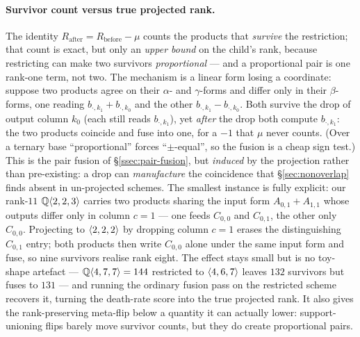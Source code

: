 \paragraph{Survivor count versus true projected rank.} The identity
\(R_{\text{after}}=R_{\text{before}}-\mu\) counts the products that \emph{survive} the
restriction; that count is exact, but only an \emph{upper bound} on the child's rank,
because restricting can make two survivors \emph{proportional} --- and a proportional pair
is one rank-one term, not two. The mechanism is a linear form losing a coordinate: suppose
two products agree on their \(\alpha\)- and \(\gamma\)-forms and differ only in their
\(\beta\)-forms, one reading \(b_{\cdot,k_1}+b_{\cdot,k_0}\) and the other
\(b_{\cdot,k_1}-b_{\cdot,k_0}\). Both survive the drop of output column \(k_0\) (each still
reads \(b_{\cdot,k_1}\)), yet \emph{after} the drop both compute \(b_{\cdot,k_1}\): the two
products coincide and fuse into one, for a \(-1\) that \(\mu\) never counts. (Over a
ternary base ``proportional'' forces ``\(\pm\)-equal'', so the fusion is a cheap sign
test.) This is the pair fusion of \S\ref{ssec:pair-fusion}, but \emph{induced} by the
projection rather than pre-existing: a drop can \emph{manufacture} the coincidence that
\S\ref{sec:nonoverlap} finds absent in un-projected schemes. The smallest instance is fully
explicit: our rank-\(11\) \(\mathbb{Q}\langle 2, 2, 3 \rangle\) carries two products sharing the
input form \(A_{0,1}+A_{1,1}\) whose outputs differ only in column \(c=1\) --- one feeds
\(C_{0,0}\) and \(C_{0,1}\), the other only \(C_{0,0}\). Projecting to \(\langle 2, 2, 2 \rangle\)
by dropping column \(c=1\) erases the distinguishing \(C_{0,1}\) entry; both products then
write \(C_{0,0}\) alone under the same input form and fuse, so nine survivors realise rank
eight. The effect stays small but is no toy-shape artefact ---
\(\mathbb{Q}\langle 4, 7, 7 \rangle=144\) restricted to \(\langle 4, 6, 7 \rangle\) leaves \(132\)
survivors but fuses to \(131\) --- and running the
ordinary fusion pass on the restricted scheme recovers it, turning the death-rate score
into the true projected rank. It also gives the rank-preserving meta-flip below a quantity
it can actually lower: support-unioning flips barely move survivor counts, but they do
create proportional pairs.

